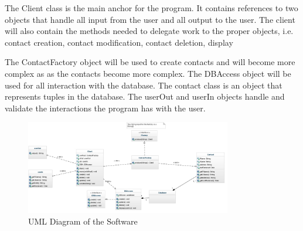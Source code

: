 \documentclass{article}
\begin{document}
The Client class is the main anchor for the program. 
It contains references to two objects that handle all input from the user and all output to the user. 
The client will also contain the methods needed to delegate work to the proper objects, i.e. contact creation, contact modification, contact deletion, display

The ContactFactory object will be used to create contacts and will become more complex as as the contacts become more complex.
The DBAccess object will be used for all interaction with the database.
The contact class is an object that represents tuples in the database.
The userOut and userIn objects handle and validate the interactions the program has with the user.
\begin{figure}[H]
\centering
\includegraphics[width=90mm]{img/UML.jpg}
\caption{UML Diagram of the Software \label{UML}}
\end{figure}



\end{document}

